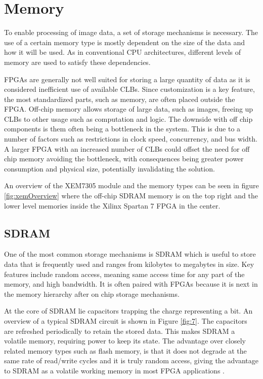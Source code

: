 \documentclass[12pt]{report}
\begin{document}
\section{Memory}
To enable processing of image data, a set of storage mechanisms is necessary. The use of a certain memory type is mostly dependent on the size of the data and how it will be used. As in conventional CPU architectures, different levels of memory are used to satisfy these dependencies.
\par
FPGAs are generally not well suited for storing a large quantity of data as it is considered inefficient use of available CLBs. Since customization is a key feature, the most standardized parts, such as memory, are often placed outside the FPGA. Off-chip memory allows storage of large data, such as images, freeing up CLBs to other usage such as computation and logic. The downside with off chip components is them often being a bottleneck in the system. This is due to a number of factors such as restrictions in clock speed, concurrency, and bus width. A larger FPGA with an increased number of CLBs could offset the need for off chip memory avoiding the bottleneck, with consequences being greater power consumption and physical size, potentially invalidating the solution.
\par
An overview of the XEM7305 module and the memory types can be seen in figure \ref{fig:xemOverview} where the off-chip SDRAM memory is on the top right and the lower level memories inside the Xilinx Spartan 7 FPGA in the center.

\subsection{SDRAM}
One of the most common storage mechanisms is SDRAM which is useful to store data that is frequently used and ranges from kilobytes to megabytes in size. Key features include random access, meaning same access time for any part of the memory, and high bandwidth. It is often paired with FPGAs because it is next in the memory hierarchy after on chip storage mechanisms.
\par
At the core of SDRAM lie capacitors trapping the charge representing a bit. An overview of a typical SDRAM circuit is shown in Figure \ref{fig:7}. The capacitors are refreshed periodically to retain the stored data. This makes SDRAM a volatile memory, requiring power to keep its state. The advantage over closely related memory types such as flash memory, is that it does not degrade at the same rate of read/write cycles and it is truly random access, giving the advantage to SDRAM as a volatile working memory in most FPGA applications \citep{SDRAMFLASH} \citep{NANDNORFlash}.
\end{document}
